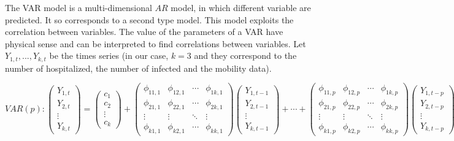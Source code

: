 The VAR model is a multi-dimensional $AR$ model, in which different variable are predicted. 
It so corresponds to a second type model. 
This model exploits the correlation between variables. 
The value of the parameters of a VAR have physical sense and can be interpreted to find correlations between variables. 
Let $Y_{1,t}, ..., Y_{k,t}$ be the times series (in our case, $k=3$ and they correspond to the number of hospitalized, the number of infected and the mobility data).


\[
VAR(p) : 
\begin{pmatrix}
Y_{1,t} \\
Y_{2,t} \\
\vdots \\
Y_{k,t}
\end{pmatrix}
=
\begin{pmatrix}
c_1 \\
c_2 \\
\vdots \\
c_k
\end{pmatrix}
+
\begin{pmatrix}
\phi_{11,1} & \phi_{12,1} & \cdots & \phi_{1k,1} \\
\phi_{21,1} & \phi_{22,1} & \cdots & \phi_{2k,1} \\
\vdots & \vdots & \ddots & \vdots \\
\phi_{k1,1} & \phi_{k2,1} & \cdots & \phi_{kk,1}
\end{pmatrix}
\begin{pmatrix}
Y_{1,t-1} \\
Y_{2,t-1} \\
\vdots \\
Y_{k,t-1}
\end{pmatrix}
+ \cdots +
\begin{pmatrix}
\phi_{11,p} & \phi_{12,p} & \cdots & \phi_{1k,p} \\
\phi_{21,p} & \phi_{22,p} & \cdots & \phi_{2k,p} \\
\vdots & \vdots & \ddots & \vdots \\
\phi_{k1,p} & \phi_{k2,p} & \cdots & \phi_{kk,p}
\end{pmatrix}
\begin{pmatrix}
Y_{1,t-p} \\
Y_{2,t-p} \\
\vdots \\
Y_{k,t-p}
\end{pmatrix}
+
\begin{pmatrix}
\epsilon_{1,t} \\
\epsilon_{2,t} \\
\vdots \\
\epsilon_{k,t}
\end{pmatrix}
\]


